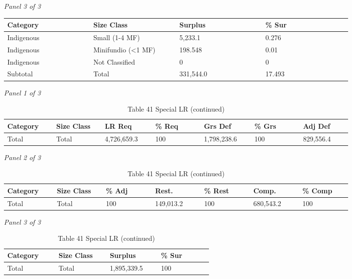 \documentclass[12pt]{article}
\begin{document}
\begin{landscape}
\begin{table}[H]
\vspace{0.6em}

\textit{Panel 3 of 3}\\[2pt]
{\fontsize{12}{14}\selectfont
\setlength{\tabcolsep}{3pt}
\renewcommand{\arraystretch}{1.08}
\begin{tabular}{p{0.205\linewidth}p{0.205\linewidth}p{0.205\linewidth}p{0.205\linewidth}}
\toprule
Category & Size Class & Surplus & \% Sur \\
\midrule
Indigenous & Small (1-4 MF) & 5,233.1 & 0.276 \\
Indigenous & Minifundio (<1 MF) & 198.548 & 0.01 \\
Indigenous & Not Classified & 0 & 0 \\
Subtotal & Total & 331,544.0 & 17.493 \\
\bottomrule
\end{tabular}
}
\end{table}
\begin{table}[H]
\centering
\caption{Table 41 Special LR (continued)}
\textit{Panel 1 of 3}\\[2pt]
{\fontsize{12}{14}\selectfont
\setlength{\tabcolsep}{3pt}
\renewcommand{\arraystretch}{1.08}
\begin{tabular}{p{0.117\linewidth}p{0.117\linewidth}p{0.117\linewidth}p{0.117\linewidth}p{0.117\linewidth}p{0.117\linewidth}p{0.117\linewidth}}
\toprule
Category & Size Class & LR Req & \% Req & Grs Def & \% Grs & Adj Def \\
\midrule
Total & Total & 4,726,659.3 & 100 & 1,798,238.6 & 100 & 829,556.4 \\
\bottomrule
\end{tabular}
}

\vspace{0.6em}

\textit{Panel 2 of 3}\\[2pt]
{\fontsize{12}{14}\selectfont
\setlength{\tabcolsep}{3pt}
\renewcommand{\arraystretch}{1.08}
\begin{tabular}{p{0.117\linewidth}p{0.117\linewidth}p{0.117\linewidth}p{0.117\linewidth}p{0.117\linewidth}p{0.117\linewidth}p{0.117\linewidth}}
\toprule
Category & Size Class & \% Adj & Rest. & \% Rest & Comp. & \% Comp \\
\midrule
Total & Total & 100 & 149,013.2 & 100 & 680,543.2 & 100 \\
\bottomrule
\end{tabular}
}

\vspace{0.6em}

\textit{Panel 3 of 3}\\[2pt]
{\fontsize{12}{14}\selectfont
\setlength{\tabcolsep}{3pt}
\renewcommand{\arraystretch}{1.08}
\begin{tabular}{p{0.205\linewidth}p{0.205\linewidth}p{0.205\linewidth}p{0.205\linewidth}}
\toprule
Category & Size Class & Surplus & \% Sur \\
\midrule
Total & Total & 1,895,339.5 & 100 \\
\bottomrule
\end{tabular}
}
\end{table}
\end{landscape}
\end{document}

